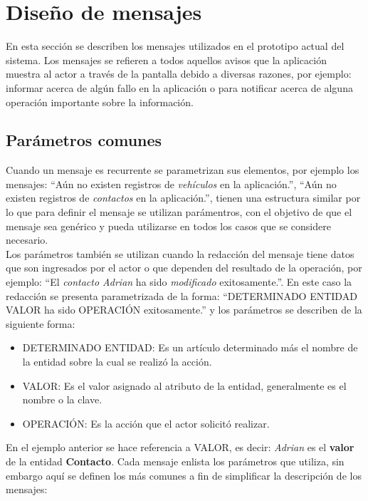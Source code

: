 \section{Diseño de mensajes}
	En esta sección se describen los mensajes utilizados en el prototipo actual del sistema. Los mensajes se refieren a todos
	aquellos avisos que la aplicación muestra al actor a través de la pantalla debido a diversas
	razones, por ejemplo: informar acerca de algún fallo en la aplicación o para notificar acerca de alguna operación importante sobre la información.

\subsection{Parámetros comunes}
    Cuando un mensaje es recurrente se parametrizan sus elementos, por ejemplo los mensajes: ``Aún no existen registros de {\em vehículos} en la aplicación.'', ``Aún no existen registros de {\em contactos} en la aplicación.'',  tienen una estructura similar 
    por lo que para definir el mensaje se utilizan parámentros, con el objetivo de que el mensaje sea genérico y  
    pueda utilizarse en todos los casos que se considere necesario.\\
    
    Los parámetros también se utilizan cuando la redacción del mensaje tiene datos que son ingresados por el actor o que dependen del resultado de la operación, por ejemplo: 
    ``El {\em contacto Adrian} ha sido {\em modificado} exitosamente.''. En este caso la redacción se presenta parametrizada de la forma: ``DETERMINADO ENTIDAD VALOR ha sido OPERACIÓN exitosamente.'' y los 
    parámetros se describen de la siguiente forma:
    
    \begin{itemize}
	\item DETERMINADO ENTIDAD: Es un artículo determinado más el nombre de la entidad sobre la cual se realizó la acción.
	\item VALOR: Es el valor asignado al atributo de la entidad, generalmente es el nombre o la clave.
	\item OPERACIÓN: Es la acción que el actor solicitó realizar.
    \end{itemize}

    En el ejemplo anterior se hace referencia a VALOR, es decir: {\em Adrian} es el {\bf valor}  de la entidad {\bf Contacto}. Cada mensaje enlista los parámetros 
    que utiliza, sin embargo aquí se definen los más comunes a fin de simplificar la descripción de los mensajes:

